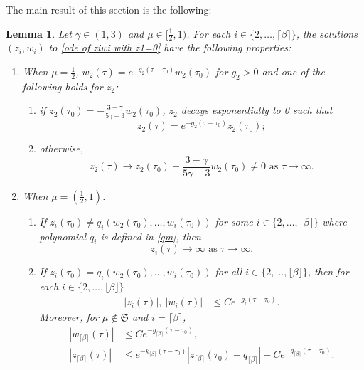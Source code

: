 \documentclass{article}
\newcommand{\ga}{\gamma}
\def\be{\begin{equation}}
\def\ee{\end{equation}}
\def\ssmu{\mathfrak S}
\numberwithin{equation}{section}
\newtheorem{lemma}[theorem]{Lemma}
\begin{document}
The main result of this section is the following: 
\begin{lemma}\label{lemma 3.7}
 Let $\ga\in(1,3)$ and $\mu\in[\frac12,1)$. For each $i\in\{2,\dots,\lceil \beta \rceil \}$, the solutions $(z_i,w_i)$ to \eqref{ode of ziwi with z1=0} have the following properties:  
 \begin{enumerate}
     \item When $\mu=\frac12$, $w_2(\tau) = e^{-g_2 (\tau-\tau_0)}w_2(\tau_0)$ for  $g_2>0$ and 
      one of the following holds for $z_2$:
     \begin{enumerate}
         \item if $z_2(\tau_0) = -\frac{3-\ga}{5\ga-3} w_2(\tau_0)$, $z_2$ decays exponentially to 0 such that 
         \be
            z_2(\tau) = e^{- g_2 (\tau-\tau_0)} z_2(\tau_0);
         \ee
         \item otherwise,
         \be
            z_2(\tau) \to z_2(\tau_0)+\frac{3-\ga}{5\ga-3} w_2(\tau_0) \neq 0 \text{ as }\tau\to \infty.
         \ee
     \end{enumerate}
         \item When $\mu=(\frac12,1)$. 
         \begin{enumerate}
             \item If $z_i(\tau_0) \neq q_i(w_2(\tau_0),\dots, w_i(\tau_0))$ for some $i\in \{2,\dots,\lfloor\beta\rfloor\}$ where polynomial $q_i$ is defined in \eqref{qm}, then
             \be\label{case 2.1}
               z_i(\tau) \to \infty \text{ as }\tau\to \infty.
               \ee
             \item If $z_i(\tau_0)  = q_i(w_2(\tau_0),\dots, w_i(\tau_0))$ for all $i\in \{2,\dots,\lfloor\beta\rfloor\}$, then for each $i\in\{2,\dots,\lfloor\beta\rfloor\}$
             \begin{align}
                |z_i(\tau)|, \ |w_i(\tau)| &\leq C e^{-g_i(\tau-\tau_0)}. \label{j<=i}
      \end{align}
     Moreover, for $\mu\notin \ssmu$ and $i =\lceil \beta \rceil$,  
      \begin{align}
                |w_{\lceil \beta \rceil}(\tau)| &\leq C e^{-g_{\lceil \beta \rceil}(\tau-\tau_0)},\label{wi+1}\\
                |z_{\lceil \beta \rceil}(\tau)| &\leq e^{-k_{\lceil \beta \rceil}(\tau-\tau_0)}\left |z_{\lceil \beta \rceil}(\tau_0)-q_{\lceil \beta \rceil} \right | + Ce^{-g_{\lceil \beta \rceil}(\tau-\tau_0)}.\label{zi+1}
                \end{align}
         \end{enumerate}
 \end{enumerate}
    \end{lemma}
\end{document}
